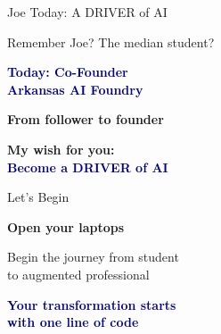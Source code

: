 \documentclass[aspectratio=169,12pt]{beamer}
\begin{document}
\begin{frame}{Joe Today: A DRIVER of AI}
\begin{center}
\normalsize
Remember Joe? The median student?

\vspace{0.3cm}
\large
\textcolor{darkblue}{\textbf{Today: Co-Founder\\Arkansas AI Foundry}}

\vspace{0.3cm}
\small
{}

\vspace{0.3cm}
\normalsize
\textcolor{successgreen}{\textbf{From follower to founder}}

\vspace{0.3cm}
\large
\textbf{My wish for you:}\\
\textcolor{darkblue}{\textbf{Become a DRIVER of AI}}
\end{center}
\end{frame}

\begin{frame}{Let's Begin}
\begin{center}
\Large
\faLaptop

\vspace{0.3cm}
\large
\textbf{Open your laptops}

\vspace{0.3cm}
\normalsize
Begin the journey from student\\
to augmented professional

\vspace{0.5cm}
\normalsize
\textcolor{darkblue}{\textbf{Your transformation starts\\
with one line of code}}
\end{center}
\end{frame}
\end{document}
